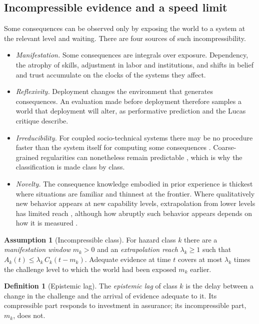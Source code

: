 \documentclass[11pt]{article}
\theoremstyle{plain}
\theoremstyle{definition}
\newtheorem{definition}{Definition}
\newtheorem{assumption}{Assumption}
\begin{document}
\subsection{Incompressible evidence and a speed limit}

Some consequences can be observed only by exposing the world to a system at the relevant level and waiting. There are four sources of such incompressibility.
\begin{itemize}[leftmargin=*]
\item \emph{Manifestation.} Some consequences are integrals over exposure. Dependency, the atrophy of skills, adjustment in labor and institutions, and shifts in belief and trust accumulate on the clocks of the systems they affect.
\item \emph{Reflexivity.} Deployment changes the environment that generates consequences. An evaluation made before deployment therefore samples a world that deployment will alter, as performative prediction \citep{perdomo2020} and the Lucas critique \citep{lucas1976} describe.
\item \emph{Irreducibility.} For coupled socio-technical systems there may be no procedure faster than the system itself for computing some consequences \citep{moore1990}. Coarse-grained regularities can nonetheless remain predictable \citep{israeli2004}, which is why the classification is made class by class.
\item \emph{Novelty.} The consequence knowledge embodied in prior experience is thickest where situations are familiar and thinnest at the frontier. Where qualitatively new behavior appears at new capability levels, extrapolation from lower levels has limited reach \citep{wei2022}, although how abruptly such behavior appears depends on how it is measured \citep{schaeffer2023}.
\end{itemize}

\begin{assumption}[Incompressible class]\label{ass:incompressible}
For hazard class $k$ there are a \emph{manifestation window} $m_k>0$ and an \emph{extrapolation reach} $\lambda_k\ge1$ such that $A_k(t)\le\lambda_k\,C_k(t-m_k)$. Adequate evidence at time $t$ covers at most $\lambda_k$ times the challenge level to which the world had been exposed $m_k$ earlier.
\end{assumption}

\begin{definition}[Epistemic lag]\label{def:lag}
The \emph{epistemic lag} of class $k$ is the delay between a change in the challenge and the arrival of evidence adequate to it. Its compressible part responds to investment in assurance; its incompressible part, $m_k$, does not.
\end{definition}
\end{document}

